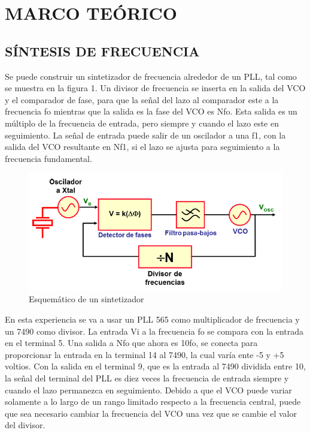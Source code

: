 \section{MARCO TEÓRICO}
\subsection{SÍNTESIS DE FRECUENCIA}
Se puede construir un sintetizador de frecuencia alrededor de un PLL, tal como se muestra en la figura 1. Un divisor de frecuencia se inserta en la salida del VCO y el comparador de fase, para que la señal del lazo al comparador este a la frecuencia fo mientras que la salida es la fase del VCO es Nfo. Esta salida es un múltiplo de la frecuencia de entrada, pero siempre y cuando el lazo este en seguimiento. La señal de entrada puede salir de un oscilador a una f1, con la salida del VCO resultante en Nf1, si el lazo se ajusta para seguimiento a la frecuencia fundamental.

\begin{figure}[H]
    \centering
    \includegraphics[width=.6\textwidth]{imgs/2.1. Esquemático de un sintetizador.png}
    \caption{Esquemático de un sintetizador}
\end{figure}

En esta experiencia se va a usar un PLL 565 como multiplicador de frecuencia y un 7490 como divisor. La entrada Vi a la frecuencia fo se compara con la entrada en el terminal 5. Una salida a Nfo que ahora es 10fo, se conecta para proporcionar la entrada en la terminal 14 al 7490, la cual varía ente -5 y +5 voltios. Con la salida en el terminal 9, que es la entrada al 7490 dividida entre 10, la señal del terminal del PLL es diez veces la frecuencia de entrada siempre y cuando el lazo permanezca en seguimiento. Debido a que el VCO puede variar solamente a lo largo de un rango limitado respecto a la frecuencia central, puede que sea necesario cambiar la frecuencia del VCO una vez que se cambie el valor del divisor.
\newpage
